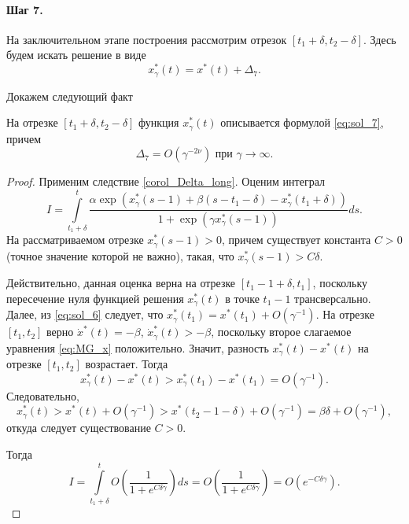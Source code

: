 \paragraph{Шаг 7.} На заключительном этапе построения рассмотрим отрезок $[t_1+\delta, t_2-\delta]$. Здесь будем искать решение в виде
\begin{equation}
	\label{eq:sol_7}
	x_\gamma^*(t) = x^*(t) + \Delta_7.
\end{equation}

Докажем следующий факт
\begin{lemma}
\label{lm:Delta_7}
На отрезке $[t_1 + \delta, t_2 - \delta]$ функция $x_\gamma^*(t)$ описывается формулой \eqref{eq:sol_7}, причем
\[
\Delta_7 = O(\gamma^{- 2\nu})\text{ при }\gamma\to\infty.
\]
\end{lemma}
\begin{proof}
Применим следствие \ref{corol_Delta_long}.
Оценим интеграл
%
\begin{equation*}
	I = \int \limits_{t_1+\delta}^{t}\frac{\alpha\exp(x_\gamma^*(s - 1) + \beta(s - t_1 - \delta) - x_\gamma^*(t_1 + \delta))}{1  +\exp(\gamma x_\gamma^*(s - 1))}ds.
\end{equation*}
%
На рассматриваемом отрезке $x_\gamma^*(s - 1) > 0$, причем существует константа $C > 0$ (точное значение которой не важно), такая, что $x_\gamma^*(s-1) > C\delta.$

Действительно, данная оценка верна на отрезке $[t_1 - 1 + \delta, t_1]$, поскольку пересечение нуля функцией решения $x^*_{\gamma}(t)$ в точке $t_1 - 1$ трансверсально. Далее, из \eqref{eq:sol_6} следует, что $x^*_{\gamma}(t_1) = x^*(t_1) + O(\gamma^{-1})$. На отрезке $[t_1, t_2]$ верно $\dot{x}^*(t) = -\beta$, $\dot{x}^*_\gamma(t) > -\beta$, поскольку второе слагаемое уравнения \eqref{eq:MG_x} положительно. Значит, разность $x^*_{\gamma}(t) - x^*(t)$ на отрезке $[t_1, t_2]$ возрастает. Тогда
%
\[
x^*_{\gamma}(t) - x^*(t) > x^*_{\gamma}(t_1) - x^*(t_1) = O(\gamma^{-1}).
\]
%
Следовательно,
%
\[
x^*_{\gamma}(t) > x^*(t) + O(\gamma^{-1}) > x^*(t_2 - 1 - \delta) + O(\gamma^{-1}) = \beta\delta + O(\gamma^{-1}),
\]
откуда следует существование $C > 0$.
	
Тогда
\begin{equation}
	\label{I_step7}
	I = \int\limits_{t_1+\delta}^{t} O\left(\frac{1}{1 + e^{C \delta \gamma}}\right) ds = O\left(\frac{1}{1 + e^{C \delta \gamma}}\right) = O(e^{-C\delta\gamma}).
\end{equation}


\end{proof}

